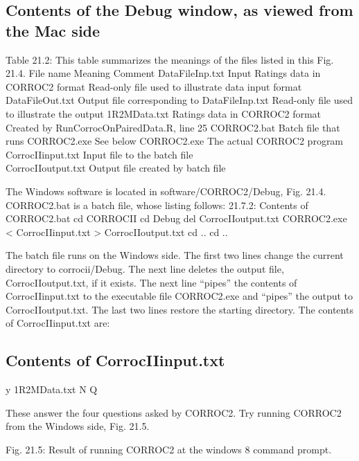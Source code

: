\documentclass[
]{book}
\begin{document}
\hypertarget{bivariate-binormal-model-corroc2-application-debug-window}{%
\subsection{Contents of the Debug window, as viewed from the Mac side}\label{bivariate-binormal-model-corroc2-application-debug-window}}

Table 21.2: This table summarizes the meanings of the files listed in this Fig. 21.4.
File name Meaning Comment
DataFileInp.txt Input Ratings data in CORROC2 format Read-only file used to illustrate data input format
DataFileOut.txt Output file corresponding to DataFileInp.txt Read-only file used to illustrate the output
1R2MData.txt Ratings data in CORROC2 format Created by RunCorrocOnPairedData.R, line 25
CORROC2.bat Batch file that runs CORROC2.exe See below
CORROC2.exe The actual CORROC2 program\\
CorrocIIinput.txt Input file to the batch file\\
CorrocIIoutput.txt Output file created by batch file

The Windows software is located in software/CORROC2/Debug, Fig. 21.4. CORROC2.bat is a batch file, whose listing follows:
21.7.2: Contents of CORROC2.bat
cd CORROCII
cd Debug
del CorrocIIoutput.txt
CORROC2.exe \textless{} CorrocIIinput.txt \textgreater{} CorrocIIoutput.txt
cd ..
cd ..

The batch file runs on the Windows side. The first two lines change the current directory to corrocii/Debug. The next line deletes the output file, CorrocIIoutput.txt, if it exists. The next line ``pipes'' the contents of CorrocIIinput.txt to the executable file CORROC2.exe and ``pipes'' the output to CorrocIIoutput.txt. The last two lines restore the starting directory. The contents of CorrocIIinput.txt are:

\hypertarget{bivariate-binormal-model-corroc2-application-corrocii-input}{%
\subsection{Contents of CorrocIIinput.txt}\label{bivariate-binormal-model-corroc2-application-corrocii-input}}

y
1R2MData.txt
N
Q

These answer the four questions asked by CORROC2. Try running CORROC2 from the Windows side, Fig. 21.5.

Fig. 21.5: Result of running CORROC2 at the windows 8 command prompt.
\end{document}
